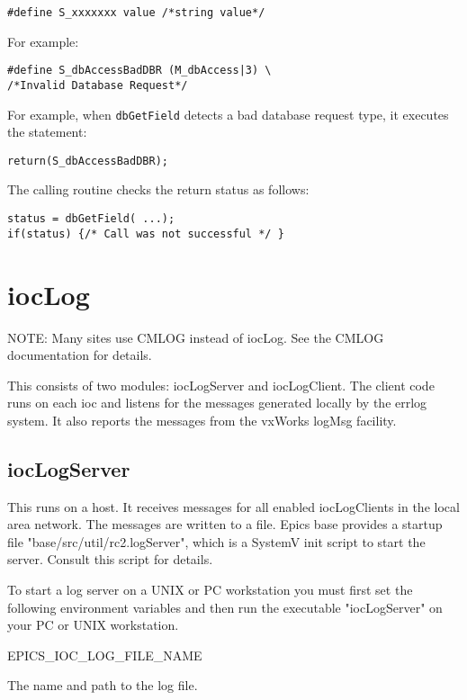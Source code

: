 \begin{verbatim}#define S_xxxxxxx value /*string value*/
\end{verbatim}For example:

\begin{verbatim}#define S_dbAccessBadDBR (M_dbAccess|3) \
/*Invalid Database Request*/
\end{verbatim}For example, when \verb|dbGetField| detects a bad database request type, it executes the statement:

\begin{verbatim}return(S_dbAccessBadDBR);
\end{verbatim}The calling routine checks the return status as follows:

\begin{verbatim}status = dbGetField( ...);
if(status) {/* Call was not successful */ }
\end{verbatim}\section{iocLog}

NOTE: Many sites use CMLOG instead of iocLog. See the CMLOG documentation for details.

This consists of two modules: iocLogServer and iocLogClient. The client code runs on each ioc and listens for the 
messages generated locally by the errlog system. It also reports the messages from the vxWorks logMsg facility.

\subsection{iocLogServer}

This runs on a host. It receives messages for all enabled iocLogClients in the local area network. The messages are written 
to a file. Epics base provides a startup file "base/src/util/rc2.logServer", which is a SystemV init script to start the server. 
Consult this script for details.

To start a log server on a UNIX or PC workstation you must first set the following environment variables and then run the 
executable "iocLogServer" on your PC or UNIX workstation. 

\begin{description}\item {}EPICS\_IOC\_LOG\_FILE\_NAME 

\end{description}The name and path to the log file.


